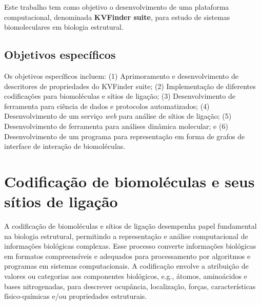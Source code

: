 \documentclass[Portugues]{phdquali}
\def\eg{e.g.\onedot}
\begin{document}
Este trabalho tem como objetivo o desenvolvimento de uma plataforma computacional, denominada \textbf{KVFinder suite}, para estudo de sistemas biomoleculares em biologia estrutural.

\section{Objetivos específicos}

Os objetivos específicos incluem: (1) Aprimoramento e desenvolvimento de descritores de propriedades do KVFinder suite; (2) Implementação de diferentes codificações para biomoléculas e sítios de ligação; (3) Desenvolvimento de ferramenta para ciência de dados e protocolos automatizados; (4) Desenvolvimento de um serviço \textit{web} para análise de sítios de ligação; (5) Desenvolvimento de ferramenta para análises dinâmica molecular; e (6) Desenvolvimento de um programa para representação em forma de grafos de interface de interação de biomoléculas.


\chapter{Codificação de biomoléculas e seus sítios de ligação}

A codificação de biomoléculas e sítios de ligação desempenha papel fundamental na biologia estrutural, permitindo a representação e análise computacional de informações biológicas complexas. Esse processo converte informações biológicas em formatos compreensíveis e adequados para processamento por algoritmos e programas em sistemas computacionais. A codificação envolve a atribuição de valores ou categorias aos componentes biológicos, \eg, átomos, aminoácidos e bases nitrogenadas, para descrever ocupância, localização, forças, características físico-químicas e/ou propriedades estruturais. 
\end{document}
